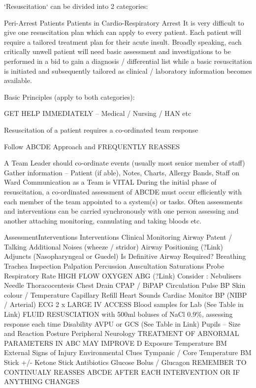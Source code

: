 \documentclass[]{book}
\begin{document}
`Resuscitation` can be divided into 2 categories:

Peri-Arrest Patients
Patients in Cardio-Respiratory Arrest
It is very difficult to give one resuscitation plan which can apply to every patient. Each patient will require a tailored treatment plan for their acute insult. Broadly speaking, each critically unwell patient will need basic assessment and investigations to be performed in a bid to gain a diagnosis / differential list while a basic resuscitation is initiated and subsequently tailored as clinical / laboratory information becomes available.

Basic Principles (apply to both categories):

GET HELP IMMEDIATELY -- Medical / Nursing / HAN etc

Resuscitation of a patient requires a co-ordinated team response

Follow ABCDE Approach and FREQUENTLY REASSES

A Team Leader should co-ordinate events (usually most senior member of staff)
Gather information -- Patient (if able), Notes, Charts, Allergy Bands, Staff on Ward
Communication as a Team is VITAL
During the initial phase of resuscitation, a co-ordinated assessment of ABCDE must occur efficiently with each member of the team appointed to a system(s) or tasks. Often assessments and interventions can be carried synchronously with one person assessing and another attaching monitoring, cannulating and taking bloods etc.

AssessmentInterventions Interventions
Clinical
Monitoring
Airway Patent / Talking
Additional Noises (wheeze / stridor) Airway Positioning (?Link)
Adjuncts
(Nasopharyngeal or Guedel)
Is Definitive Airway Required?
Breathing Trachea
Inspection
Palpation
Percussion
Auscultation Saturations Probe
Respiratory Rate HIGH FLOW OXYGEN
ABG (?Link)
Consider :
Nebulisers
Needle Thoracocentesis
Chest Drain
CPAP / BiPAP
Circulation Pulse
BP
Skin colour / Temperature
Capillary Refill
Heart Sounds Cardiac Monitor
BP (NIBP / Arterial)
ECG 2 x LARGE IV ACCESS
Blood samples for Lab
(See Table in Link)
FLUID RESUSCIATION with 500ml boluses of NaCl 0.9\%, assessing response each time
Disability AVPU or GCS
(See Table in Link)
Pupils -- Size and Reaction
Posture
Peripheral Neurology TREATMENT OF ABNORMAL PARAMETERS IN ABC MAY IMPROVE D
Exposure Temperature
BM
External Signs of Injury
Environmental Clues Tympanic / Core Temperature
BM Stick +/- Ketone Stick Antibiotics
Glucose Bolus / Glucagon
REMEMBER TO CONTINUALY REASSES ABCDE AFTER EACH INTERVENTION OR IF ANYTHING CHANGES
\end{document}
